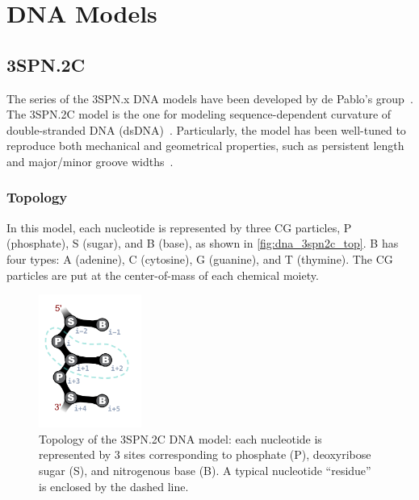 \chapter{DNA Models}
\label{chap:dna}


\section{3SPN.2C}
\label{sec:dna_3spn2c}

The series of the 3SPN.x DNA models have been developed by de Pablo's
group~\cite{Freeman2011, Hinckley2013, Freeman2014}.  The 3SPN.2C model is the
one for modeling sequence-dependent curvature of double-stranded DNA
(dsDNA)~\cite{Freeman2014}.  Particularly, the model has been well-tuned to
reproduce both mechanical and geometrical properties, such as persistent length
and major/minor groove widths~\cite{Hinckley2013, Freeman2014}. 

\subsection{Topology}
\label{subsec:dna_3spn2c_top}

In this model, each nucleotide is represented by three CG particles, P
(phosphate), S (sugar), and B (base), as shown in \autoref{fig:dna_3spn2c_top}.
B has four types: A (adenine), C (cytosine), G (guanine), and T (thymine).  The
CG particles are put at the center-of-mass of each chemical moiety.

\begin{figure}[ht]
  \centering
  \includegraphics[width=0.3\textwidth]{figures/DNA_3spn2c_top.png}
  \caption{Topology of the 3SPN.2C DNA model: each nucleotide is represented by
    3 sites corresponding to phosphate (P), deoxyribose sugar (S), and
    nitrogenous base (B).  A typical nucleotide ``residue'' is enclosed by the
    dashed line.}
  \label{fig:dna_3spn2c_top}
\end{figure}


